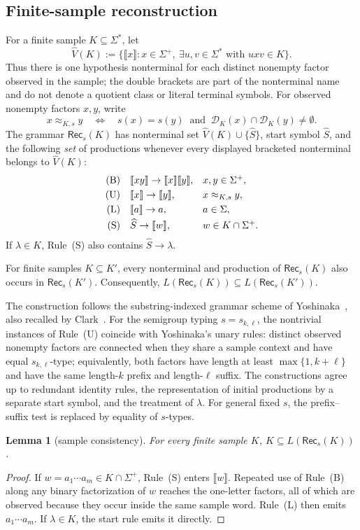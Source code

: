 \documentclass[11pt,a4paper]{article}
\newcommand{\NT}[1]{\llbracket #1\rrbracket}
\newtheorem{lemma}[theorem]{Lemma}
\theoremstyle{remark}
\theoremstyle{plain}
\newcommand{\D}{\mathcal{D}}
\begin{document}
\subsection{Finite-sample reconstruction}
For a finite sample $K\subseteq\Sigma^*$, let
\[
 \widehat V(K):=
 \{\NT{x}:x\in\Sigma^+,\ \exists u,v\in\Sigma^*\text{ with }uxv\in K\}.
\]
Thus there is one hypothesis nonterminal for each distinct nonempty factor
observed in the sample; the double brackets are part of the nonterminal name and do
not denote a quotient class or literal terminal symbols.  For observed nonempty factors $x,y$, write
\[
 x\approx_{K,s}y
 \quad\Longleftrightarrow\quad
 s(x)=s(y)\ \text{ and }\ \D_K(x)\cap\D_K(y)\ne\emptyset .
\]
The grammar $\mathsf{Rec}_s(K)$ has nonterminal set
$\widehat V(K)\cup\{\widehat S\}$, start symbol $\widehat S$, and the following
\emph{set} of productions whenever every displayed bracketed nonterminal belongs to
$\widehat V(K)$:
\[
\begin{array}{rll}
\textup{(B)}&\NT{xy}\to\NT{x}\NT{y},&x,y\in\Sigma^+,\\[1mm]
\textup{(U)}&\NT{x}\to\NT{y},&x\approx_{K,s}y,\\[1mm]
\textup{(L)}&\NT{a}\to a,&a\in\Sigma,\\[1mm]
\textup{(S)}&\widehat S\to\NT{w},&w\in K\cap\Sigma^+.
\end{array}
\]
If $\lambda\in K$, Rule~\textup{(S)} also contains
$\widehat S\to\lambda$.

For finite samples $K\subseteq K'$, every nonterminal and production
of $\mathsf{Rec}_s(K)$ also occurs in $\mathsf{Rec}_s(K')$.
Consequently,
$L(\mathsf{Rec}_s(K))\subseteq L(\mathsf{Rec}_s(K'))$.

The construction follows the substring-indexed grammar scheme of
Yoshinaka~\cite[Section~4, Algorithm~1]{yoshinaka2008}, also recalled
by Clark~\cite[Section~4, Algorithm~1]{clark2013}.
For the semigroup typing $s=s_{k,\ell}$, the nontrivial instances of Rule~\textup{(U)}
coincide with Yoshinaka's unary rules: distinct observed nonempty factors
are connected when they share a sample context and have equal
$s_{k,\ell}$-type; equivalently, both factors have length at least
$\max\{1,k+\ell\}$ and have the same length-$k$ prefix and
length-$\ell$ suffix.
The constructions agree up to redundant identity rules, the
representation of initial productions by a separate start symbol, and
the treatment of $\lambda$.  For general fixed $s$, the
prefix--suffix test is replaced by equality of $s$-types.

\begin{lemma}[sample consistency]\label{lem:sample-consistency}
For every finite sample $K$, $K\subseteq L(\mathsf{Rec}_s(K))$.
\end{lemma}
\begin{proof}
If $w=a_1\cdots a_m\in K\cap\Sigma^+$, Rule~\textup{(S)} enters $\NT{w}$.
Repeated use of Rule~\textup{(B)} along any binary factorization of $w$
reaches the one-letter factors, all of which are observed because they occur
inside the same sample word.  Rule~\textup{(L)} then emits
$a_1\cdots a_m$.  If $\lambda\in K$, the start rule emits it directly.
\end{proof}
\end{document}
